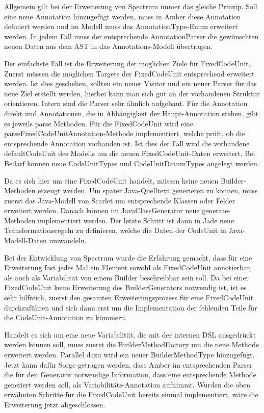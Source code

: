 \documentclass[12pt,oneside,a4paper,parskip]{scrbook}
\begin{document}
Allgemein gilt bei der Erweiterung von Spectrum immer das gleiche Prinzip. Soll eine neue Annotation hinzugefügt werden, muss in Amber diese Annotation definiert werden und im Modell muss das AnnotationType-Enum erweitert werden. In jedem Fall muss der entsprechende AnnotationParser die gewünschten neuen Daten aus dem AST in das Annotations-Modell übertragen.

Der einfachste Fall ist die Erweiterung der möglichen Ziele für FixedCodeUnit. Zuerst müssen die möglichen Targets der FixedCodeUnit entsprechend erweitert werden. Ist dies geschehen, sollten ein neuer Visitor und ein neuer Parser für das neue Ziel erstellt werden, hierbei kann man sich gut an der vorhandenen Struktur orientieren. Intern sind die Parser sehr ähnlich aufgebaut. Für die Annotation direkt und Annotationen, die in Abhängigkeit der Haupt-Annotation stehen, gibt es jeweils parse Methoden. Für die FixedCodeUnit wird eine parseFixedCodeUnitAnnotation-Methode implementiert, welche prüft, ob die entsprechende Annotation vorhanden ist. Ist dies der Fall wird die vorhandene defaultCodeUnit des Modells um die neuen FixedCodeUnit-Daten erweitert. Bei Bedarf können neue CodeUnitTypes und CodeUnitDatumTypes angelegt werden.

Da es sich hier um eine FixedCodeUnit handelt, müssen keine neuen Builder-Methoden erzeugt werden. Um später Java-Quelltext generieren zu können, muss zuerst das Java-Modell von Scarlet um entsprechende Klassen oder Felder erweitert werden. Danach können im JavaClassGenerator neue generate-Methoden implementiert werden. Der letzte Schritt ist dann in Jade neue Transformationsregeln zu definieren, welche die Daten der CodeUnit in Java-Modell-Daten umwandeln.

Bei der Entwicklung von Spectrum wurde die Erfahrung gemacht, dass für eine Erweiterung fast jedes Mal ein Element sowohl als FixedCodeUnit annotierbar, als auch als Variabilität von einem Builder beschreibbar sein soll. Da bei einer FixedCodeUnit keine Erweiterung des BuilderGenerators notwendig ist, ist es sehr hilfreich, zuerst den gesamten Erweiterungsprozess für eine FixedCodeUnit durchzuführen und sich dann erst um die Implementation der fehlenden Teile für die CodeUnit-Annotation zu kümmern.

Handelt es sich um eine neue Variabilität, die mit der internen DSL ausgedrückt werden können soll, muss zuerst die BuilderMethodFactory um die neue Methode erweitert werden. Parallel dazu wird ein neuer BuilderMethodType hinzugefügt. Jetzt kann dafür Sorge getragen werden, dass Amber im entsprechenden Parser die für den Generator notwendige Information, dass eine entsprechende Methode generiert werden soll, als Variabilitäts-Annotation aufnimmt. Wurden die oben erwähnten Schritte für die FixedCodeUnit bereits einmal implementiert, wäre die Erweiterung jetzt abgeschlossen.
\end{document}
